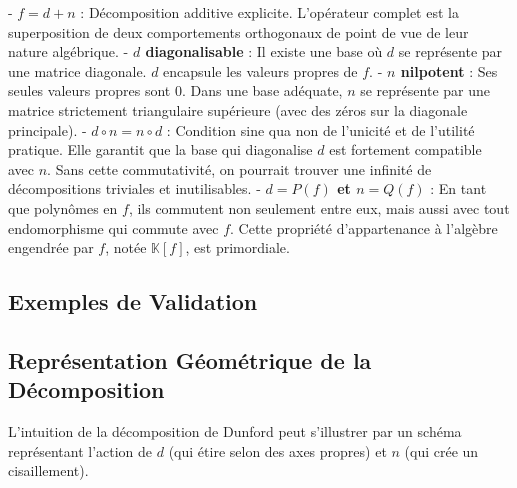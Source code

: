 \documentclass[11pt,a4paper]{article}
\begin{document}
- \textbf{$f = d + n$} : Décomposition additive explicite. L'opérateur complet est la superposition de deux comportements orthogonaux de point de vue de leur nature algébrique.
- \textbf{$d$ diagonalisable} : Il existe une base où $d$ se représente par une matrice diagonale. $d$ encapsule les valeurs propres de $f$.
- \textbf{$n$ nilpotent} : Ses seules valeurs propres sont $0$. Dans une base adéquate, $n$ se représente par une matrice strictement triangulaire supérieure (avec des zéros sur la diagonale principale).
- \textbf{$d \circ n = n \circ d$} : Condition sine qua non de l'unicité et de l'utilité pratique. Elle garantit que la base qui diagonalise $d$ est fortement compatible avec $n$. Sans cette commutativité, on pourrait trouver une infinité de décompositions triviales et inutilisables.
- \textbf{$d = P(f)$ et $n = Q(f)$} : En tant que polynômes en $f$, ils commutent non seulement entre eux, mais aussi avec tout endomorphisme qui commute avec $f$. Cette propriété d'appartenance à l'algèbre engendrée par $f$, notée $\mathbb{K}[f]$, est primordiale.

\subsection{Exemples de Validation}
\subsection{Représentation Géométrique de la Décomposition}

L'intuition de la décomposition de Dunford peut s'illustrer par un schéma représentant l'action de $d$ (qui étire selon des axes propres) et $n$ (qui crée un cisaillement).
\end{document}
